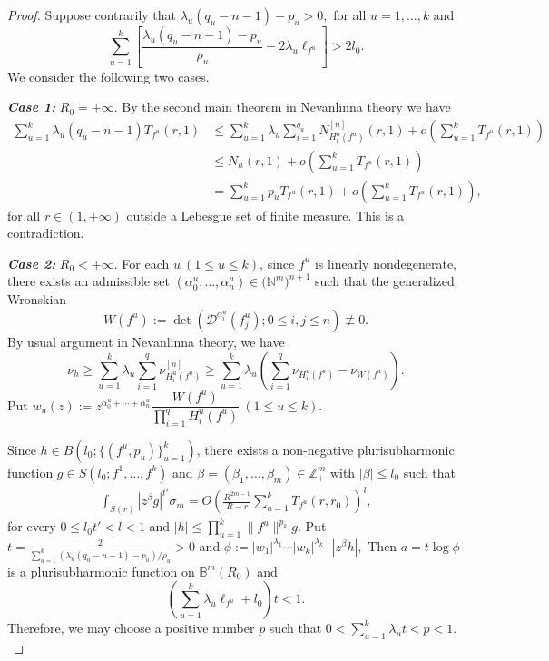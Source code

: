 \documentclass[12pt, a4paper, oneside]{amsart}
\newcommand{\N}{\mathbb{N}}
\newcommand{\B}{\mathbb{B}}
\numberwithin{equation}{section}
\begin{document}
\begin{proof} Suppose contrarily that $\lambda_u(q_u-n-1)-p_u> 0,$ for all $u=1,\ldots,k$ and
$$ \sum_{u=1}^k\left [\frac{\lambda_u(q_u-n-1)-p_u}{\rho_u}-2\lambda_u \ell_{f^u}\right ]> 2l_0.$$
We consider the following two cases.

\noindent
\textbf{\textit{Case 1:}} $R_0=+\infty$. By the second main theorem in Nevanlinna theory we have
\begin{align*}
\sum_{u=1}^k\lambda_u(q_u-n-1)T_{f^u}(r,1)&\le\sum_{u=1}^k\lambda_u\sum_{i=1}^{q_u}N^{[n]}_{H^u_i(f^u)}(r,1)+o(\sum_{u=1}^kT_{f^u}(r,1))\\
&\le N_h(r,1)+o(\sum_{u=1}^kT_{f^u}(r,1))\\
&=\sum_{u=1}^kp_uT_{f^u}(r,1)+o(\sum_{u=1}^kT_{f^u}(r,1)),
\end{align*}
for all $r\in(1,+\infty)$ outside a Lebesgue set of finite measure.
This is a contradiction.

\noindent
\textbf{\textit{Case 2:}}  $R_0<+\infty$. For each $u\ (1\le u\le k)$, since $f^u$ is linearly nondegenerate, there exists an admissible set $(\alpha_0^u,\ldots,\alpha_n^u)\in\mathbb (\N^m)^{n+1}$ such that the generalized Wronskian
	$$ W(f^u):=\det\left (\mathcal D^{\alpha_i^u}(f_j^u); 0\le i,j\le n\right)\not\equiv 0. $$
	By usual argument in Nevanlinna theory, we have
	$$\nu_h\ge \sum_{u=1}^k\lambda_u\sum_{i=1}^q\nu^{[n]}_{H^u_i(f^u)}\ge\sum_{u=1}^k\lambda_u\left (\sum_{i=1}^q\nu_{H^u_i(f^u)}-\nu_{W(f^u)}\right).$$
	Put $w_u(z):=z^{\alpha_0^u+\cdots +\alpha_n^u}\dfrac{W(f^u)}{\prod_{i=1}^{q}H^u_i(f^u)}\ (1\le u\le k)$. 

Since $h\in B(l_0;\{(f^u,p_u)\}_{u=1}^k)$, there exists a non-negative plurisubharmonic function $g\in S(l_0;f^1,\ldots,f^k)$ and $\beta =(\beta_1,\ldots,\beta_m)\in\mathbb Z^{m}_+$ with $|\beta|\le l_0$ such that 
	\begin{align}\label{3.6}
	\int_{S(r)}\left |z^\beta g\right|^{t'}\sigma_m=O\left (\frac{R^{2m-1}}{R-r}\sum_{u=1}^kT_{f^u}(r,r_0)\right )^l,
	\end{align}
for every $0\le l_0t'<l<1$ and $|h|\le \prod_{u=1}^k\|f^u\|^{p_k}g.$
	Put $ t=\frac{2}{\sum_{u=1}^k(\lambda_u(q_u-n-1)-p_u)/\rho_u}>0$ and $ \phi:=|w_1|^{\lambda_1}\cdots |w_k|^{\lambda_k}\cdot|z^\beta h|,$
	Then $a=t\log\phi$ is a plurisubharmonic function on $\B^m(R_0)$ and
	$$(\sum_{u=1}^{k}\lambda_u\ell_{f^u}+l_0)t< 1.$$
	Therefore, we may choose a positive number $p$ such that $0<\sum_{u=1}^{k}\lambda_ut<p<1.$
	

\end{proof}
\end{document}
